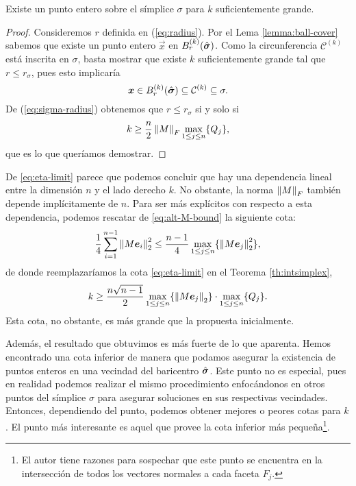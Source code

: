 \begin{theorem}
	\label{th:intsimplex}
	Existe un punto entero sobre el símplice $\sigma$ para $k$ suficientemente grande.
\end{theorem}
\begin{proof}
	Consideremos $r$ definida en (\ref{eq:radius}). Por el Lema \ref{lemma:ball-cover} sabemos que
	existe un punto entero $\vec{x}$ en $B_r^{(k)}(\hat{\boldsymbol{ \sigma }})$. Como la circunferencia
	$\mathcal{C}^{(k)}$ está inscrita en $\sigma$, basta mostrar que existe $k$
	suficientemente grande tal que $r \leq r_\sigma$, pues esto implicaría
	\begin{equation*}
		\boldsymbol{x} \in B_r^{(k)}(\hat{\boldsymbol{ \sigma }}) \subseteq \mathcal{C}^{(k)} \subseteq \sigma.
	\end{equation*}
	De (\ref{eq:sigma-radius}) obtenemos que $r \leq r_\sigma$ si y solo si
	\begin{equation}
		\label{eq:eta-limit}
		k \geq \frac{n}{2}\left\lVert M \right\rVert_F\max_{1 \leq j \leq n} \lbrace Q_j \rbrace,
	\end{equation}
	que es lo que queríamos demostrar.
\end{proof}
De \eqref{eq:eta-limit} parece que podemos concluir que hay una dependencia lineal entre la
dimensión $n$ y el lado derecho $k$. No obstante, la norma $\left\lVert M \right\rVert_F$ también depende
implícitamente de $n$. Para ser más explícitos con respecto a esta dependencia, podemos rescatar de
\eqref{eq:alt-M-bound} la siguiente cota:
\begin{equation*}
	\frac{1}{4}\sum_{i=1}^{n-1}\left\lVert M\boldsymbol{e}_i \right\rVert_2^2
	\leq
	\frac{n-1}{4}\max_{1 \leq j \leq n} \lbrace \left\lVert M\boldsymbol{e}_j \right\rVert_2^2 \rbrace,
\end{equation*}
de donde reemplazaríamos la cota \eqref{eq:eta-limit} en el Teorema \ref{th:intsimplex},
\begin{equation*}
	k \geq \frac{n\sqrt{n-1}}{2} \max_{1 \leq j \leq n} \lbrace \left\lVert M\boldsymbol{e}_j \right\rVert_2 \rbrace \cdot
	\max_{1 \leq j \leq n} \lbrace Q_j \rbrace.
\end{equation*}
Esta cota, no obstante, es más grande que la propuesta inicialmente.

Además, el resultado que obtuvimos es más fuerte de lo que aparenta. Hemos encontrado una
cota inferior de manera que podamos asegurar la existencia de puntos enteros en una vecindad del
baricentro $\hat{\boldsymbol{ \sigma }}$. Este punto no es especial, pues en realidad podemos realizar el mismo
procedimiento enfocándonos en otros puntos del símplice $\sigma$ para asegurar soluciones en sus
respectivas vecindades. Entonces, dependiendo del punto, podemos obtener mejores o peores cotas para
$k$. El punto más interesante es aquel que provee la cota inferior más pequeña\footnote{
	El autor tiene razones para sospechar que este punto se encuentra en la intersección de todos
	los vectores normales a cada faceta $F_j$.
}.

